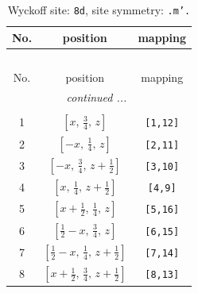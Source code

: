 \documentclass[fleqn,8pt]{jsarticle}
\begin{document}
\begin{longtable}{ccc}
\caption{Wyckoff site: {\tt 8d}, site symmetry: {\tt .m'.}}
 \\
 \hline \hline
No. & position & mapping \\ \hline \endfirsthead

\multicolumn{2}{l}{\tablename\ \thetable{}} \\
 \hline \hline
No. & position & mapping \\ \hline \endhead

 \hline \hline
\multicolumn{2}{r}{\footnotesize\it continued ...} \\ \endfoot

 \hline \hline
\multicolumn{2}{r}{} \\ \endlastfoot

1 & $\left[ x,\, \frac{3}{4},\, z \right]$ & {\tt [1,12]} \\ \hline
2 & $\left[ - x,\, \frac{1}{4},\, z \right]$ & {\tt [2,11]} \\ \hline
3 & $\left[ - x,\, \frac{3}{4},\, z + \frac{1}{2} \right]$ & {\tt [3,10]} \\ \hline
4 & $\left[ x,\, \frac{1}{4},\, z + \frac{1}{2} \right]$ & {\tt [4,9]} \\ \hline
5 & $\left[ x + \frac{1}{2},\, \frac{1}{4},\, z \right]$ & {\tt [5,16]} \\ \hline
6 & $\left[ \frac{1}{2} - x,\, \frac{3}{4},\, z \right]$ & {\tt [6,15]} \\ \hline
7 & $\left[ \frac{1}{2} - x,\, \frac{1}{4},\, z + \frac{1}{2} \right]$ & {\tt [7,14]} \\ \hline
8 & $\left[ x + \frac{1}{2},\, \frac{3}{4},\, z + \frac{1}{2} \right]$ & {\tt [8,13]} \\
\end{longtable}
\renewcommand{\arraystretch}{1.2}
\end{document}
